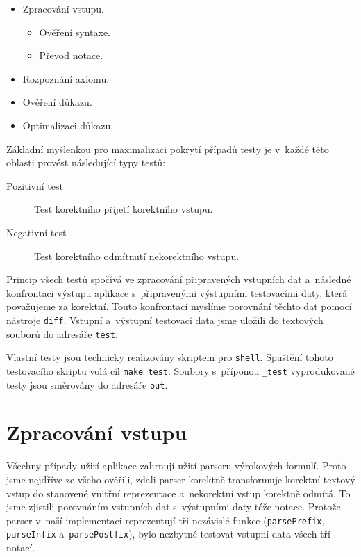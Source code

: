 \documentclass[thesis=B,czech,hidelinks]{thesis}[2012/06/26]
\begin{document}
\begin{itemize}
	\item Zpracování vstupu.
	\begin{itemize}
		\item Ověření syntaxe.
		\item Převod notace.
	\end{itemize}
	\item Rozpoznání axiomu.
	\item Ověření důkazu.
	\item Optimalizaci důkazu.
\end{itemize}

Základní myšlenkou pro maximalizaci pokrytí případů testy je v~každé této oblasti provést následující typy testů:

\begin{description}
	\item[Pozitivní test] Test korektního přijetí korektního vstupu.
	\item[Negativní test] Test korektního odmítnutí nekorektního vstupu.
\end{description}

Princip všech testů spočívá ve zpracování připravených vstupních dat a~následné konfrontaci výstupu aplikace s~připravenými výstupními testovacími daty, která považujeme za korektní. Touto konfrontací myslíme porovnání těchto dat pomocí nástroje \texttt{diff}. Vstupní a~výstupní testovací data jsme uložili do textových souborů do adresáře \texttt{test}.

Vlastní testy jsou technicky realizovány skriptem pro \texttt{shell}. Spuštění tohoto testovacího skriptu volá cíl \texttt{make test}. Soubory s~příponou \texttt{\_test} vyprodukované testy jsou směrovány do adresáře \texttt{out}.

\section{Zpracování vstupu}

Všechny případy užití aplikace zahrnují užití parseru výrokových formulí. Proto jsme nejdříve ze všeho ověřili, zdali parser korektně transformuje korektní textový vstup do stanovené vnitřní reprezentace a~nekorektní vstup korektně odmítá. To jsme zjistili porovnáním vstupních dat s~výstupními daty téže notace. Protože parser v~naší implementaci reprezentují tři nezávislé funkce (\texttt{parsePrefix}, \texttt{parseInfix} a~\texttt{parsePostfix}), bylo nezbytné testovat vstupní data všech tří notací. 
\end{document}
